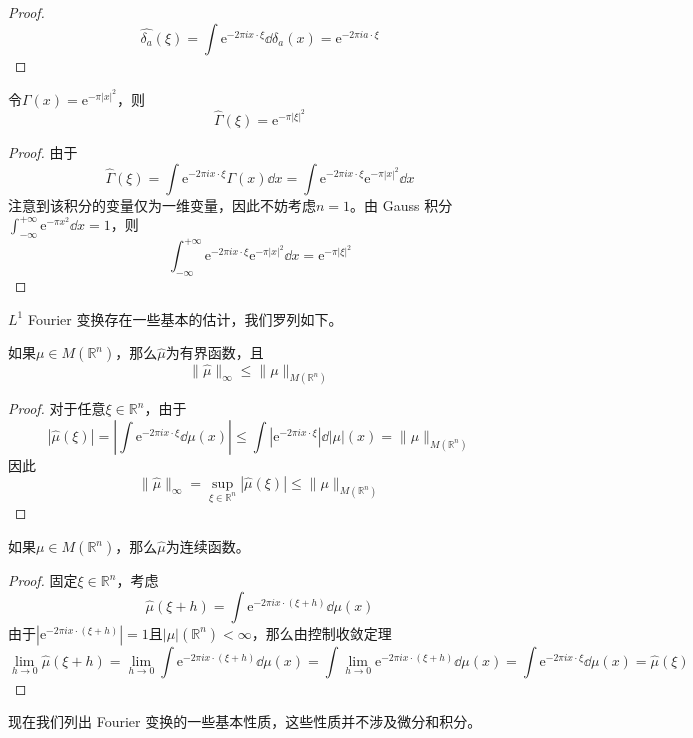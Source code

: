\documentclass[lang = cn, %
scheme = chinese          %
]
{elegantbook}             %
\newcommand{\R}{\mathbb{R}}            %
\newcommand{\ee}[1]{\mathrm{e}^{#1}}           %
\newcommand{\dis}{\displaystyle}
\begin{document}
\begin{proof}
	\[
	\widehat{\delta_a}(\xi)
	=\int\ee{-2\pi i x \cdot \xi}\dd \delta_a(x)
	=\ee{-2\pi i a\cdot \xi}
	\]
\end{proof}

\begin{example}
	令$\Gamma(x)=\ee{-\pi|x|^2}$，则
	\[
	\widehat{\Gamma}(\xi)=\ee{-\pi|\xi|^2}
	\]
\end{example}

\begin{proof}
	由于
	\[
	\widehat{\Gamma}(\xi)
	=\int\ee{-2\pi i x \cdot \xi}\Gamma(x)\dd x
	=\int\ee{-2\pi i x \cdot \xi}\ee{-\pi|x|^2}\dd x
	\]
	注意到该积分的变量仅为一维变量，因此不妨考虑$n=1$。由 Gauss 积分$\dis \int_{-\infty}^{+\infty}\ee{-\pi x^2}\dd x=1$，则
	\[
	\int_{-\infty}^{+\infty}\ee{-2\pi i x \cdot \xi}\ee{-\pi|x|^2}\dd x
	=\ee{-\pi|\xi|^2}
	\]
\end{proof}

$L^1$ Fourier 变换存在一些基本的估计，我们罗列如下。

\begin{proposition}
	如果$\mu\in M(\R^n)$，那么$\widehat{\mu}$为有界函数，且
	\[
	\|\widehat{\mu}\|_{\infty}
	\le\|\mu\|_{M(\R^n)}
	\]
\end{proposition}

\begin{proof}
	对于任意$\xi\in\R^n$，由于
	\[
	|\widehat{\mu}(\xi)|
	=\left| \int\ee{-2\pi i x \cdot \xi}\dd\mu(x) \right|
	\le\int|\ee{-2\pi i x \cdot \xi}|\dd|\mu|(x)
	=\|\mu\|_{M(\R^n)}
	\]
	因此
	\[
	\|\widehat{\mu}\|_{\infty}
	=\sup_{\xi\in\R^n}|\widehat{\mu}(\xi)|
	\le\|\mu\|_{M(\R^n)}
	\]
\end{proof}

\begin{proposition}
	如果$\mu\in M(\R^n)$，那么$\widehat{\mu}$为连续函数。
\end{proposition}

\begin{proof}
	固定$\xi\in\R^n$，考虑
	\[
	\widehat{\mu}(\xi+h)
	=\int\ee{-2\pi i x \cdot (\xi+h)}\dd\mu(x)
	\]
	由于$|\ee{-2\pi i x \cdot (\xi+h)}|=1$且$|\mu|(\R^n)<\infty$，那么由控制收敛定理
	\[
	\lim_{h\to 0}\widehat{\mu}(\xi+h)
	=\lim_{h\to 0}\int\ee{-2\pi i x \cdot (\xi+h)}\dd\mu(x)
	=\int\lim_{h\to 0}\ee{-2\pi i x \cdot (\xi+h)}\dd\mu(x)
	=\int\ee{-2\pi i x \cdot \xi}\dd\mu(x)
	=\widehat{\mu}(\xi)
	\]
\end{proof}

现在我们列出 Fourier 变换的一些基本性质，这些性质并不涉及微分和积分。
\end{document}
